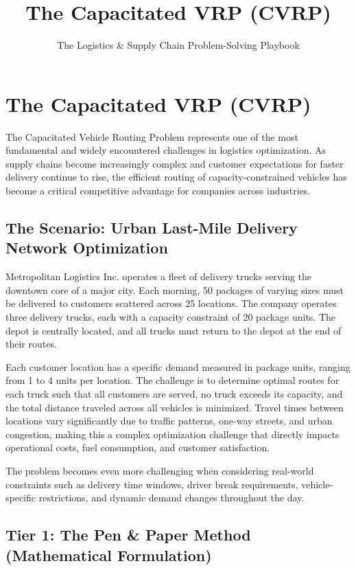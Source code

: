 \documentclass{article}
\title{The Capacitated VRP (CVRP)}
\author{The Logistics \& Supply Chain Problem-Solving Playbook}
\date{}
\begin{document}
\maketitle

\section{The Capacitated VRP (CVRP)}

The Capacitated Vehicle Routing Problem represents one of the most fundamental and widely encountered challenges in logistics optimization. As supply chains become increasingly complex and customer expectations for faster delivery continue to rise, the efficient routing of capacity-constrained vehicles has become a critical competitive advantage for companies across industries.

\subsection{The Scenario: Urban Last-Mile Delivery Network Optimization}

Metropolitan Logistics Inc. operates a fleet of delivery trucks serving the downtown core of a major city. Each morning, 50 packages of varying sizes must be delivered to customers scattered across 25 locations. The company operates three delivery trucks, each with a capacity constraint of 20 package units. The depot is centrally located, and all trucks must return to the depot at the end of their routes.

Each customer location has a specific demand measured in package units, ranging from 1 to 4 units per location. The challenge is to determine optimal routes for each truck such that all customers are served, no truck exceeds its capacity, and the total distance traveled across all vehicles is minimized. Travel times between locations vary significantly due to traffic patterns, one-way streets, and urban congestion, making this a complex optimization challenge that directly impacts operational costs, fuel consumption, and customer satisfaction.

The problem becomes even more challenging when considering real-world constraints such as delivery time windows, driver break requirements, vehicle-specific restrictions, and dynamic demand changes throughout the day.

\subsection{Tier 1: The Pen \& Paper Method (Mathematical Formulation)}
\end{document}
